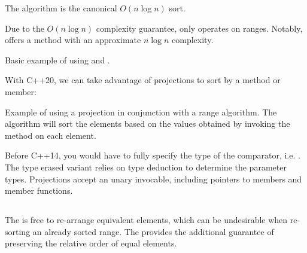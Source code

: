 The  algorithm is the canonical $O(n\log n)$ sort.


Due to the $O(n\log n)$ complexity guarantee,  only operates on  ranges. Notably,  offers a method with an approximate $n\log n$ complexity.

\begin{codebox}[]{\href{https://compiler-explorer.com/z/vef61TWj9}{\ExternalLink}}
\footnotesize Basic example of using  and .
\tcblower
{}
\end{codebox}

With C++20, we can take advantage of projections to sort by a method or member:

\begin{codebox}[breakable]{\href{https://compiler-explorer.com/z/4aGenq9b6}{\ExternalLink}}
\footnotesize Example of using a projection in conjunction with a range algorithm. The algorithm will sort the elements based on the values obtained by invoking the method  on each element.
\tcblower
{}
\end{codebox}

Before C++14, you would have to fully specify the type of the comparator, i.e. . The type erased variant  relies on type deduction to determine the parameter types. Projections accept an unary invocable, including pointers to members and member functions.

\subsection{\texorpdfstring{}{\texttt{std::stable\_sort}}}

The  is free to re-arrange equivalent elements, which can be undesirable when re-sorting an already sorted range. The  provides the additional guarantee of preserving the relative order of equal elements.


